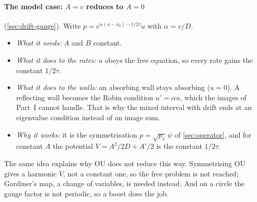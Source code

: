\documentclass[11pt]{article}
\numberwithin{equation}{section}
\begin{document}
\paragraph{The model case: $A=v$ reduces to $A=0$} (\cref{sec:drift-gauge}). Write
$p=e^{\alpha(x-x_0)-t/2\tau}u$ with $\alpha=v/D$.
\begin{itemize}
  \item \emph{What it needs:} $A$ and $B$ constant.
  \item \emph{What it does to the rates:} $u$ obeys the free equation, so every rate gains the constant $1/2\tau$.
  \item \emph{What it does to the walls:} an absorbing wall stays absorbing ($u=0$). A reflecting wall becomes the
        Robin condition $u'=\alpha u$, which the images of Part~I cannot handle. That is why the mixed interval with
        drift ends at an eigenvalue condition instead of an image sum.
  \item \emph{Why it works:} it is the symmetrisation $p=\sqrt{p_s}\,\psi$ of \cref{sec:operator}, and for constant
        $A$ the potential $V=A^2/2D+A'/2$ is the constant $1/2\tau$.
\end{itemize}
The same idea explains why OU does not reduce this way. Symmetrising OU gives a harmonic $V$, not a constant one, so
the free problem is not reached; Gardiner's map, a change of variables, is needed instead. And on a circle the
gauge factor is not periodic, so a boost does the job.
\end{document}
